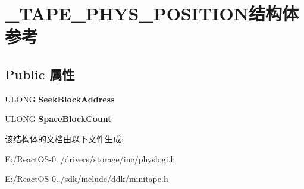 \hypertarget{struct___t_a_p_e___p_h_y_s___p_o_s_i_t_i_o_n}{}\section{\+\_\+\+T\+A\+P\+E\+\_\+\+P\+H\+Y\+S\+\_\+\+P\+O\+S\+I\+T\+I\+O\+N结构体 参考}
\label{struct___t_a_p_e___p_h_y_s___p_o_s_i_t_i_o_n}
\subsection*{Public 属性}
\begin{DoxyCompactItemize}
\item 
\mbox{\label{struct___t_a_p_e___p_h_y_s___p_o_s_i_t_i_o_n_a7493e2bc237a3287b3949c64c6d4a437}} 
U\+L\+O\+NG {\bfseries Seek\+Block\+Address}
\item 
\mbox{\label{struct___t_a_p_e___p_h_y_s___p_o_s_i_t_i_o_n_ac6cf7df4e78ffaa4fac35564f9016889}} 
U\+L\+O\+NG {\bfseries Space\+Block\+Count}
\end{DoxyCompactItemize}


该结构体的文档由以下文件生成\+:\begin{DoxyCompactItemize}
\item 
E\+:/\+React\+O\+S-\/0../drivers/storage/inc/physlogi.\+h\item 
E\+:/\+React\+O\+S-\/0../sdk/include/ddk/minitape.\+h\end{DoxyCompactItemize}
